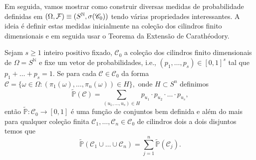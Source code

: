 Em seguida, vamos mostrar como construir diversas medidas 
de probabilidade definidas em 
$(\Omega,\mathcal{F})\equiv (S^{\mathbb{N}},\sigma(\mathscr{C}_0))$ 
tendo várias
propriedades interessantes. A ideia é definir estas medidas
inicialmente na coleção dos cilindros finito dimensionais 
e em seguida usar o Teorema da Extensão de Carathéodory.





\begin{proposicao}
Sejam $s\geq 1$ inteiro positivo fixado,
$\mathscr{C}_0$ a coleção dos cilindros finito 
dimensionais de $\Omega=S^{\mathbb{N}}$
e fixe um vetor de probabilidades, i.e., 
$(p_1,\ldots,p_s)\in [0,1]^s$ tal que 
$p_1+\ldots +p_s=1$. 
Se para cada $\mathcal{C}\in\mathscr{C}_0$
da forma 
$
\mathcal{C}
=
\{
\omega\in \Omega:
(\pi_1(\omega), \ldots,\pi_n(\omega)) \in H
\},
$
onde $H\subset S^n$ definimos
\[
\widetilde{\mathbb{P}}(\mathcal{C}) 
=
\sum_{(u_1,\ldots,u_s)\in H} 
p_{u_1}\cdot p_{u_2}\cdot\ldots\cdot p_{u_s},
\]
então $\widetilde{\mathbb{P}}:\mathscr{C}_0\to [0,1]$ é uma função 
de conjuntos bem definida e além do mais para qualquer coleção
finita $\mathcal{C}_1,\ldots,\mathcal{C}_n\in\mathscr{C}_0$
de cilindros dois a dois disjuntos temos que 
\begin{equation}\label{prop-finitamente-aditiva-med-prod-SN}
\widetilde{\mathbb{P}}(\mathcal{C}_1\cup\ldots\cup \mathcal{C}_n)
=
\sum_{j=1}^n \widetilde{\mathbb{P}}(\mathcal{C}_j).
\end{equation}
\end{proposicao}



